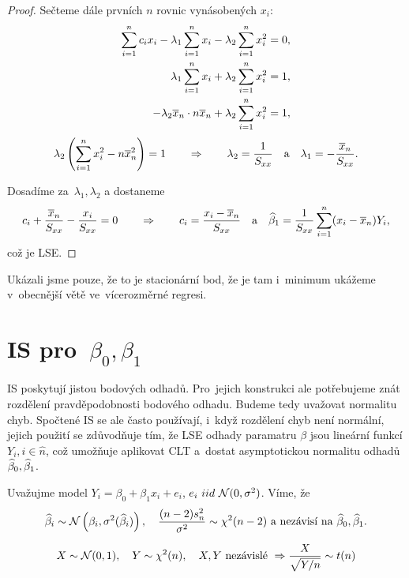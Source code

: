 \begin{theorem}
\begin{proof}
	Sečteme dále prvních $n$ rovnic vynásobených $x_i$:
	\begin{align*}
		\sum\limits_{i=1}^{n} c_i x_i - \lambda_1 \sum\limits_{i=1}^{n} x_i - \lambda_2 \sum\limits_{i=1}^{n} x_i^2 = 0, \\
		 \lambda_1 \sum\limits_{i=1}^{n} x_i + \lambda_2 \sum\limits_{i=1}^{n} x_i^2 = 1, \\
		 -\lambda_2 \overline{x}_n \cdot n \overline{x}_n + \lambda_2 \sum\limits_{i=1}^{n} x_i^2 = 1, 
	\end{align*}
	$$\lambda_2 \left(\sum\limits_{i=1}^{n} x_i^2 - n \overline{x}_n^2 \right) = 1 \qquad\Rightarrow\qquad \lambda_2 = \frac{1}{S_{xx}} \quad \text{a} \quad \lambda_1 = - \frac{\overline{x}_n}{S_{xx}}.$$
	
	Dosadíme za~$\lambda_1, \lambda_2$ a dostaneme
	 $$
		c_i + \frac{\overline{x}_n}{S_{xx}} - \frac{x_i}{S_{xx}} = 0 \qquad\Rightarrow\qquad c_i = \frac{x_i - \overline{x}_n}{S_{xx}}\quad\text{a}\quad\widehat{\beta}_1 = \frac{1}{S_{xx}} \sum\limits_{i=1}^{n} (x_i - \overline{x}_n) Y_i,
	 $$
	 což je LSE.

\end{proof}
\end{theorem}

\begin{remark}
	Ukázali jsme pouze, že to je stacionární bod, že je tam i~minimum ukážeme v~obecnější větě ve~vícerozměrné regresi.
\end{remark}

\section{IS pro~$\beta_0, \beta_1$ }
	 IS poskytují jistou  bodových odhadů.
	 Pro~jejich konstrukci ale potřebujeme znát rozdělení pravděpodobnosti bodového odhadu.
	 Budeme tedy uvažovat normalitu chyb.
	 Spočtené IS se ale často používají, i~když rozdělení chyb není normální, jejich použití se zdůvodňuje tím, že LSE odhady paramatru $\beta$ jsou lineární funkcí $Y_i, i\in\widehat{n} $, což umožňuje aplikovat CLT a~dostat asymptotickou normalitu odhadů $\widehat{\beta}_0, \widehat{\beta}_1$.

Uvažujme model $Y_i = \beta_0 + \beta_1 x_i + e_i$, $e_i~iid~\mathcal{N}(0,\sigma^2)$. Víme, že
 $$
	\widehat{\beta}_i \sim \mathcal{N}\left(\beta_i, \sigma^2(\widehat{\beta}_i)\right), \quad \frac{(n-2)s_n^2}{\sigma^2} \sim \chi^2(n-2) \text{ a~nezávisí na~} \widehat{\beta}_0, \widehat{\beta}_1.
 $$

\begin{remark}
	 $$
		X \sim \mathcal{N}(0,1),\quad Y \sim \chi^2(n), \quad X, Y \text{ nezávislé } \Rightarrow \frac{X}{\sqrt{Y/n}} \sim t(n)
	 $$
\end{remark}

